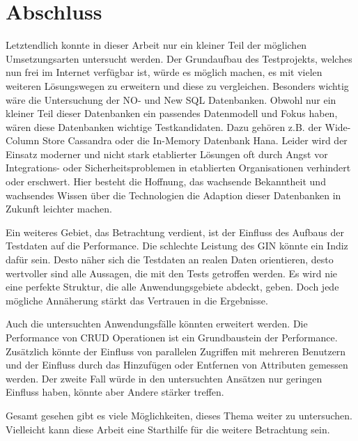 \chapter{Abschluss}

Letztendlich konnte in dieser Arbeit nur ein kleiner Teil der möglichen Umsetzungsarten untersucht werden. Der Grundaufbau des Testprojekts, welches nun frei im Internet verfügbar ist, würde es möglich machen, es mit vielen weiteren Lösungswegen zu erweitern und diese zu vergleichen.
Besonders wichtig wäre die Untersuchung der NO- und New SQL Datenbanken. Obwohl nur ein kleiner Teil dieser Datenbanken ein passendes Datenmodell und Fokus haben, wären diese Datenbanken wichtige Testkandidaten. Dazu gehören z.B. der Wide-Column Store Cassandra oder die In-Memory Datenbank Hana. Leider wird der Einsatz moderner und nicht stark etablierter Lösungen oft durch Angst vor Integrations- oder Sicherheitsproblemen in etablierten Organisationen verhindert oder erschwert. Hier besteht die Hoffnung, das wachsende Bekanntheit und wachsendes Wissen über die Technologien die Adaption dieser Datenbanken in Zukunft leichter machen.

Ein weiteres Gebiet, das Betrachtung verdient, ist der Einfluss des Aufbaus der Testdaten auf die Performance. Die schlechte Leistung des \ac{GIN} könnte ein Indiz dafür sein. Desto näher sich die Testdaten an realen Daten orientieren, desto wertvoller sind alle Aussagen, die mit den Tests getroffen werden. Es wird nie eine perfekte Struktur, die alle Anwendungsgebiete abdeckt, geben. Doch jede mögliche Annäherung stärkt das Vertrauen in die Ergebnisse.

Auch die untersuchten Anwendungsfälle könnten erweitert werden. Die Performance von CRUD Operationen ist ein Grundbaustein der Performance. Zusätzlich könnte der Einfluss von parallelen Zugriffen mit mehreren Benutzern und der Einfluss durch das Hinzufügen oder Entfernen von Attributen gemessen werden. Der zweite Fall würde in den untersuchten Ansätzen nur geringen Einfluss haben, könnte aber Andere stärker treffen.

Gesamt gesehen gibt es viele Möglichkeiten, dieses Thema weiter zu untersuchen. Vielleicht kann diese Arbeit eine Starthilfe für die weitere Betrachtung sein.








\listoftodos
